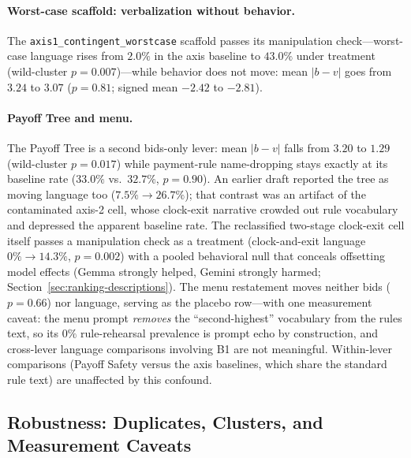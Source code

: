 \paragraph{Worst-case scaffold: verbalization without behavior.} The \texttt{axis1\_contingent\_worstcase} scaffold passes its manipulation check---worst-case language rises from $2.0\%$ in the axis baseline to $43.0\%$ under treatment (wild-cluster $p = 0.007$)---while behavior does not move: mean $|b-v|$ goes from $3.24$ to $3.07$ ($p = 0.81$; signed mean $-2.42$ to $-2.81$).

\paragraph{Payoff Tree and menu.} The Payoff Tree is a second bids-only lever: mean $|b-v|$ falls from $3.20$ to $1.29$ (wild-cluster $p = 0.017$) while payment-rule name-dropping stays exactly at its baseline rate ($33.0\%$ vs.\ $32.7\%$, $p = 0.90$). An earlier draft reported the tree as moving language too ($7.5\% \to 26.7\%$); that contrast was an artifact of the contaminated axis-2 cell, whose clock-exit narrative crowded out rule vocabulary and depressed the apparent baseline rate. The reclassified two-stage clock-exit cell itself passes a manipulation check as a treatment (clock-and-exit language $0\% \to 14.3\%$, $p = 0.002$) with a pooled behavioral null that conceals offsetting model effects (Gemma strongly helped, Gemini strongly harmed; Section~\ref{sec:ranking-descriptions}). The menu restatement moves neither bids ($p = 0.66$) nor language, serving as the placebo row---with one measurement caveat: the menu prompt \emph{removes} the ``second-highest'' vocabulary from the rules text, so its $0\%$ rule-rehearsal prevalence is prompt echo by construction, and cross-lever language comparisons involving B1 are not meaningful. Within-lever comparisons (Payoff Safety versus the axis baselines, which share the standard rule text) are unaffected by this confound.

\subsection{Robustness: Duplicates, Clusters, and Measurement Caveats}\label{app:traces-robustness}

